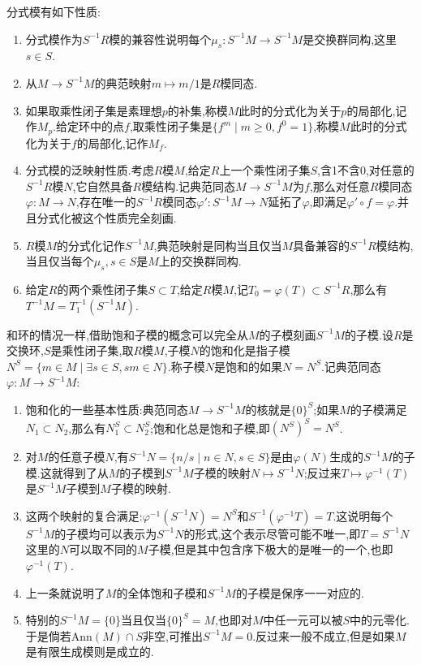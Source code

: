 分式模有如下性质:
\begin{enumerate}
	\item 分式模作为$S^{-1}R$模的兼容性说明每个$\mu_s:S^{-1}M\to S^{-1}M$是交换群同构,这里$s\in S$.
	\item 从$M\to S^{-1}M$的典范映射$m\mapsto m/1$是$R$模同态.
	\item 如果取乘性闭子集是素理想$p$的补集,称模$M$此时的分式化为关于$p$的局部化,记作$M_p$.给定环中的点$f$,取乘性闭子集是$\{f^m\mid m\ge0,f^0=1\}$,称模$M$此时的分式化为关于$f$的局部化,记作$M_f$.
	\item 分式模的泛映射性质.考虑$R$模$M$,给定$R$上一个乘性闭子集$S$,含1不含0,对任意的$S^{-1}R$模$N$,它自然具备$R$模结构.记典范同态$M\to S^{-1}M$为$f$,那么对任意$R$模同态$\varphi:M\to N$,存在唯一的$S^{-1}R$模同态$\varphi':S^{-1}M\to N$延拓了$\varphi$,即满足$\varphi'\circ f=\varphi$.并且分式化被这个性质完全刻画.
	\item $R$模$M$的分式化记作$S^{-1}M$,典范映射是同构当且仅当$M$具备兼容的$S^{-1}R$模结构,当且仅当每个$\mu_s,s\in S$是$M$上的交换群同构.
	\item 给定$R$的两个乘性闭子集$S\subset T$,给定$R$模$M$,记$T_0=\varphi(T)\subset S^{-1}R$,那么有$T^{-1}M=T_1^{-1}(S^{-1}M)$.
\end{enumerate}

和环的情况一样,借助饱和子模的概念可以完全从$M$的子模刻画$S^{-1}M$的子模.设$R$是交换环,$S$是乘性闭子集,取$R$模$M$,子模$N$的饱和化是指子模$N^S=\{m\in M\mid\exists s\in S, sm\in N\}$.称子模$N$是饱和的如果$N=N^S$.记典范同态$\varphi:M\to S^{-1}M$:
\begin{enumerate}
	\item 饱和化的一些基本性质:典范同态$M\to S^{-1}M$的核就是$\{0\}^S$;如果$M$的子模满足$N_1\subset N_2$,那么有$N_1^S\subset N_2^S$;饱和化总是饱和子模,即$(N^S)^S=N^S$.
	\item 对$M$的任意子模$N$,有$S^{-1}N=\{n/s\mid n\in N,s\in S\}$是由$\varphi(N)$生成的$S^{-1}M$的子模.这就得到了从$M$的子模到$S^{-1}M$子模的映射$N\mapsto S^{-1}N$;反过来$T\mapsto\varphi^{-1}(T)$是$S^{-1}M$子模到$M$子模的映射.
	\item 这两个映射的复合满足:$\varphi^{-1}(S^{-1}N)=N^S$和$S^{-1}(\varphi^{-1}T)=T$.这说明每个$S^{-1}M$的子模均可以表示为$S^{-1}N$的形式,这个表示尽管可能不唯一,即$T=S^{-1}N$这里的$N$可以取不同的$M$子模,但是其中包含序下极大的是唯一的一个,也即$\varphi^{-1}(T)$.
	\item 上一条就说明了$M$的全体饱和子模和$S^{-1}M$的子模是保序一一对应的.
	\item 特别的$S^{-1}M=\{0\}$当且仅当$\{0\}^S=M$,也即对$M$中任一元可以被$S$中的元零化.于是倘若$\mathrm{Ann}(M)\cap S$非空,可推出$S^{-1}M=0$.反过来一般不成立,但是如果$M$是有限生成模则是成立的.
\end{enumerate}

